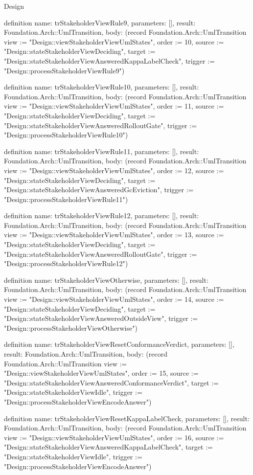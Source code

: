 \begin{lexlean}{Design}
\begin{semanticmodule}
definition{
  name: trStakeholderViewRule9,
  parameters: [],
  result: Foundation.Arch::UmlTransition,
  body: (record Foundation.Arch::UmlTransition {view := "Design::viewStakeholderViewUmlStates", order := 10, source := "Design::stateStakeholderViewDeciding", target := "Design::stateStakeholderViewAnsweredKappaLabelCheck", trigger := "Design::processStakeholderViewRule9"})
}

definition{
  name: trStakeholderViewRule10,
  parameters: [],
  result: Foundation.Arch::UmlTransition,
  body: (record Foundation.Arch::UmlTransition {view := "Design::viewStakeholderViewUmlStates", order := 11, source := "Design::stateStakeholderViewDeciding", target := "Design::stateStakeholderViewAnsweredRolloutGate", trigger := "Design::processStakeholderViewRule10"})
}

definition{
  name: trStakeholderViewRule11,
  parameters: [],
  result: Foundation.Arch::UmlTransition,
  body: (record Foundation.Arch::UmlTransition {view := "Design::viewStakeholderViewUmlStates", order := 12, source := "Design::stateStakeholderViewDeciding", target := "Design::stateStakeholderViewAnsweredGcEviction", trigger := "Design::processStakeholderViewRule11"})
}

definition{
  name: trStakeholderViewRule12,
  parameters: [],
  result: Foundation.Arch::UmlTransition,
  body: (record Foundation.Arch::UmlTransition {view := "Design::viewStakeholderViewUmlStates", order := 13, source := "Design::stateStakeholderViewDeciding", target := "Design::stateStakeholderViewAnsweredRolloutGate", trigger := "Design::processStakeholderViewRule12"})
}

definition{
  name: trStakeholderViewOtherwise,
  parameters: [],
  result: Foundation.Arch::UmlTransition,
  body: (record Foundation.Arch::UmlTransition {view := "Design::viewStakeholderViewUmlStates", order := 14, source := "Design::stateStakeholderViewDeciding", target := "Design::stateStakeholderViewAnsweredOutsideView", trigger := "Design::processStakeholderViewOtherwise"})
}

definition{
  name: trStakeholderViewResetConformanceVerdict,
  parameters: [],
  result: Foundation.Arch::UmlTransition,
  body: (record Foundation.Arch::UmlTransition {view := "Design::viewStakeholderViewUmlStates", order := 15, source := "Design::stateStakeholderViewAnsweredConformanceVerdict", target := "Design::stateStakeholderViewIdle", trigger := "Design::processStakeholderViewEncodeAnswer"})
}

definition{
  name: trStakeholderViewResetKappaLabelCheck,
  parameters: [],
  result: Foundation.Arch::UmlTransition,
  body: (record Foundation.Arch::UmlTransition {view := "Design::viewStakeholderViewUmlStates", order := 16, source := "Design::stateStakeholderViewAnsweredKappaLabelCheck", target := "Design::stateStakeholderViewIdle", trigger := "Design::processStakeholderViewEncodeAnswer"})
}


\end{semanticmodule}
\end{lexlean}

